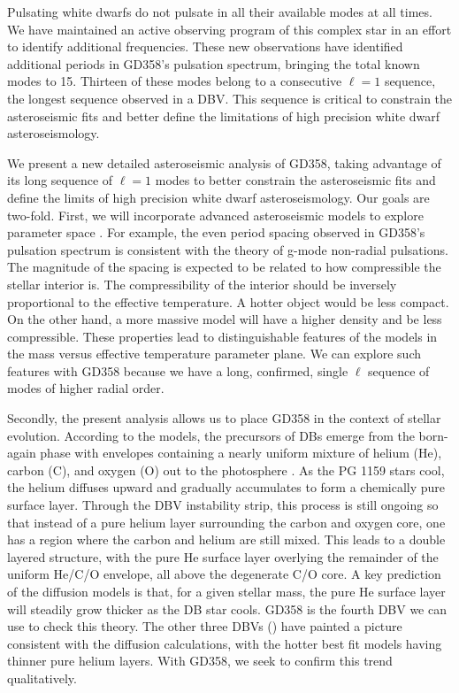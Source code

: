 \documentclass[12pt,preprint]{aastex}
\begin{document}
Pulsating white dwarfs do not pulsate in all their available modes at all times.  
We have maintained an active observing program of this complex star in an effort 
to identify additional frequencies. These new observations have identified additional 
periods in GD358's pulsation spectrum, bringing the total known modes to 15. Thirteen of 
these modes belong to a consecutive $\ell=1$ sequence, the longest sequence observed 
in a DBV. This sequence is critical to constrain the asteroseismic fits and better define the
limitations of high precision white dwarf asteroseismology. 

We present a new detailed asteroseismic analysis of GD358, taking advantage of 
its long sequence of $\ell=1$ modes to better constrain the asteroseismic fits and 
define the limits of high precision white dwarf asteroseismology.  Our goals are two-fold.  
First, we will incorporate advanced asteroseismic models to explore parameter space 
\citet{BishoffKim14}. For example, the even period spacing observed in GD358's 
pulsation spectrum is consistent with the theory of g-mode non-radial pulsations. The 
magnitude of the spacing is expected to be related to how compressible the stellar 
interior is. The compressibility of the interior should be inversely proportional to the 
effective temperature. A hotter object would be less compact. On the other hand, a more 
massive model will have a higher density and be less compressible. These properties lead 
to distinguishable features of the models in the mass versus effective temperature 
parameter plane. We can explore such features with GD358 because we have a long, 
confirmed, single $\ell$ sequence of modes of higher radial order.

Secondly, the present analysis allows us to place GD358 in the context of stellar evolution. 
According to the models, the precursors of DBs emerge from the born-again phase with 
envelopes containing a nearly uniform mixture of helium (He), carbon (C), and oxygen (O) 
out to the photosphere \citep{Dreizler98,Herwig99}. As the PG 1159 stars cool, the helium 
diffuses upward and gradually accumulates to form a chemically pure surface layer. Through 
the DBV instability strip, this process is still ongoing so that instead of a pure helium 
layer surrounding the carbon and oxygen core, one has a region where the carbon and helium 
are still mixed. This leads to a double layered structure, with the pure He surface layer 
overlying the remainder of the uniform He/C/O envelope, all above the degenerate C/O core. 
A key prediction of the diffusion models is that, for a given stellar mass, the pure He 
surface layer will steadily grow thicker as the DB star cools.  GD358 is the fourth DBV 
we can use to check this theory. The other three DBVs 
(\citet{Bishoff-Kim14,Sullivan08, Metcalfe03c}) have painted a picture consistent with 
the diffusion calculations, with the hotter best fit models having thinner pure helium 
layers. With GD358, we seek to confirm this trend qualitatively.
\end{document}
